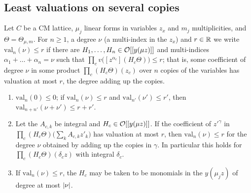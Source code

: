 \subsection{Least valuations on several copies}\label{ss:least-valuation}
Let $C$ be a CM lattice, $\mu_j$ linear forms in variables $z_x$ and $m_j$ multiplicities, and
$\Theta=\Theta_{\mu,m}$. For $n\ge1$, a degree $\nu$ (a multi-index in the $z_x$) and $r\in\mathbb{R}$ we write
$\mathrm{val}_n(\nu)\le r$ if there are $H_1,\dots,H_n\in\mathcal{O}[[y(\mu z)]]$ and multi-indices
$\alpha_1+\dots+\alpha_n=\nu$ such that $\prod_cv\bigl([z^{\alpha_c}](H_c\Theta)\bigr)\le r$; that is,
some coefficient of degree $\nu$ in some product $\prod_c(H_c\Theta)(z_c)$ over $n$ copies of the
variables has valuation at most $r$, the degree adding up the copies.

\begin{lemma}\label{lem:least-valuation-rules}
\begin{enumerate}[label=\textup{(\alph*)}]
\item $\mathrm{val}_n(0)\le0$; if $\mathrm{val}_n(\nu)\le r$ and $\mathrm{val}_{n'}(\nu')\le r'$, then
$\mathrm{val}_{n+n'}(\nu+\nu')\le r+r'$.
\item Let the $A_{c,k}$ be integral and $H_c\in\mathcal{O}[[y(\mu z)]]$. If the coefficient of $z'^\gamma$ in
$\prod_c(H_c\Theta)\bigl(\sum_kA_{c,k}z'_k\bigr)$ has valuation at most $r$, then $\mathrm{val}_n(\nu)\le r$
for the degree $\nu$ obtained by adding up the copies in $\gamma$. In particular this holds for
$\prod_c(H_c\Theta)(\delta_cz)$ with integral $\delta_c$.
\item If $\mathrm{val}_n(\nu)\le r$, the $H_c$ may be taken to be monomials in the $y(\mu_jz)$ of degree at
most $\lvert \nu\rvert$.
\end{enumerate}
\end{lemma}

